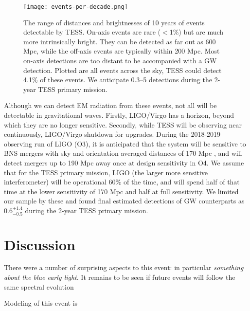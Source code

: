 \documentclass[modern]{aastex61}
\begin{document}
\begin{figure}
\centering
\texttt{[image: events-per-decade.png]}
\caption{The range of distances and brightnesses of 10 years of events detectable by TESS. On-axis events are rare ($<$1\%) but are much more intrinsically bright. They can be detected as far out as 600 Mpc, while the off-axis events are typically within 200 Mpc. Most on-axis detections are too distant to be accompanied with a GW detection. Plotted are all events across the sky, TESS could detect 4.1\% of these events. We anticipate 0.3--5 detections during the 2-year TESS primary mission.}
\label{fig:event-distances}
\end{figure}

Although we can detect EM radiation from these events, not all will be detectable in gravitational waves. Firstly, LIGO/Virgo has a horizon, beyond which they are no longer sensitive. Secondly, while TESS will be observing near continuously, LIGO/Virgo shutdown for upgrades. During the 2018-2019 observing run of LIGO (O3), it is anticipated that the system will be sensitive to BNS mergers with sky and orientation averaged distances of 170 Mpc \citep{Abbott2016}, and will detect mergers up to 190 Mpc away once at design sensitivity in O4. We assume that for the TESS primary mission, LIGO (the larger more sensitive interferometer) will be operational 60\% of the time, and will spend half of that time at the lower sensitivity of 170 Mpc and half at full sensitivity. We limited our sample by these and found final estimated detections of GW counterparts as $0.6^{+1.4}_{-0.5}$ during the 2-year TESS primary mission.


\section{Discussion}
There were a number of surprising aspects to this event: in particular \emph{something about the blue early light}. It remains to be seen if future events will follow the same spectral evolution

Modeling of this event is 
\end{document}
